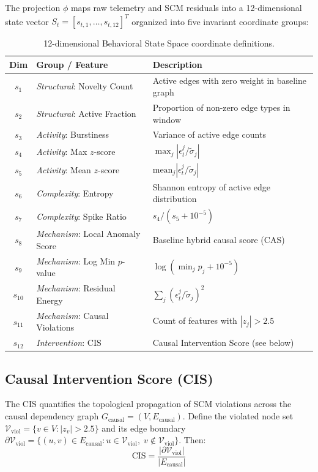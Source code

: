 The projection $\phi$ maps raw telemetry and SCM residuals into a 12-dimensional state vector
$S_t = [s_{t,1}, \ldots, s_{t,12}]^T$ organized into five invariant coordinate groups:

\begin{table}[htbp]
\centering
\small
\caption{12-dimensional Behavioral State Space coordinate definitions.}
\begin{tabular}{clp{7cm}}
\toprule
\textbf{Dim} & \textbf{Group / Feature} & \textbf{Description} \\
\midrule
$s_1$ & \textit{Structural}: Novelty Count & Active edges with zero weight in baseline graph \\
$s_2$ & \textit{Structural}: Active Fraction & Proportion of non-zero edge types in window \\
\midrule
$s_3$ & \textit{Activity}: Burstiness & Variance of active edge counts \\
$s_4$ & \textit{Activity}: Max $z$-score & $\max_j |\epsilon^j_t / \tilde{\sigma}_j|$ \\
$s_5$ & \textit{Activity}: Mean $z$-score & $\text{mean}_j |\epsilon^j_t / \tilde{\sigma}_j|$ \\
\midrule
$s_6$ & \textit{Complexity}: Entropy & Shannon entropy of active edge distribution \\
$s_7$ & \textit{Complexity}: Spike Ratio & $s_4 / (s_5 + 10^{-5})$ \\
\midrule
$s_8$ & \textit{Mechanism}: Local Anomaly Score & Baseline hybrid causal score (CAS) \\
$s_9$ & \textit{Mechanism}: Log Min $p$-value & $\log(\min_j p_j + 10^{-5})$ \\
$s_{10}$ & \textit{Mechanism}: Residual Energy & $\sum_j (\epsilon^j_t / \tilde{\sigma}_j)^2$ \\
$s_{11}$ & \textit{Mechanism}: Causal Violations & Count of features with $|z_j| > 2.5$ \\
\midrule
$s_{12}$ & \textit{Intervention}: CIS & Causal Intervention Score (see below) \\
\bottomrule
\end{tabular}
\label{tab:state_coords}
\end{table}

\subsection{Causal Intervention Score (CIS)}

The CIS quantifies the topological propagation of SCM violations across the causal dependency
graph $G_{\text{causal}} = (V, E_{\text{causal}})$. Define the violated node set
$\mathcal{V}_{\text{viol}} = \{v \in V : |z_v| > 2.5\}$ and its edge boundary
$\partial\mathcal{V}_{\text{viol}} = \{(u,v) \in E_{\text{causal}} : u \in \mathcal{V}_{\text{viol}},\;
v \notin \mathcal{V}_{\text{viol}}\}$. Then:
\begin{equation}
\text{CIS} = \frac{|\partial\mathcal{V}_{\text{viol}}|}{|E_{\text{causal}}|}
\end{equation}

